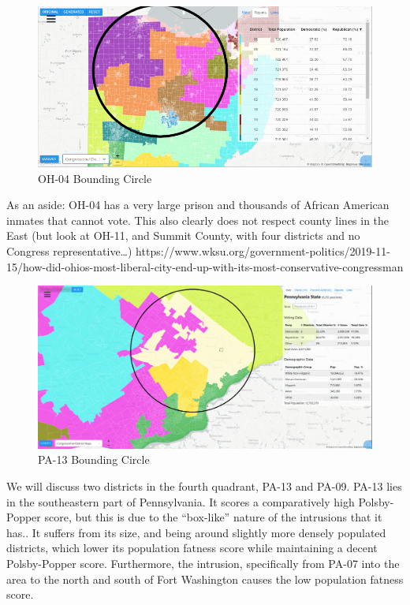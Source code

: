 \documentclass[letterpaper]{article}
\begin{document}
\begin{figure}[H]
	\includegraphics[width=\linewidth]{./figures/OH-04-BoundingCircle.png}
	\caption{OH-04 Bounding Circle}
	\label{fig:oh04boundingCircle}
\end{figure}


As an aside: OH-04 has a very large prison and thousands of African American inmates that cannot vote. This also clearly does not respect county lines in the East (but look at OH-11, and Summit County, with four districts and no Congress representative…)
https://www.wksu.org/government-politics/2019-11-15/how-did-ohios-most-liberal-city-end-up-with-its-most-conservative-congressman

\begin{figure}[H]
	\includegraphics[width=\linewidth]{./figures/PA-13-BoundingCircle.png}
	\caption{PA-13 Bounding Circle}
	\label{fig:pa13boundingCircle}
\end{figure}

We will discuss two districts in the fourth quadrant, PA-13 and PA-09. PA-13 lies in the southeastern part of Pennsylvania. It scores a comparatively high Polsby-Popper score, but this is due to the “box-like” nature of  the intrusions that it has.. It suffers from its size, and being around slightly more densely populated districts, which lower its population fatness score while maintaining a decent Polsby-Popper score. Furthermore, the intrusion, specifically from PA-07 into the area to the north and south of Fort Washington causes the low population fatness score. 
\end{document}
